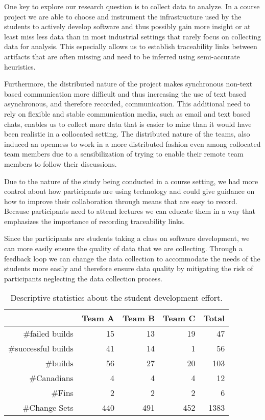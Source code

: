 One key to explore our research question is to collect data to analyze.
In a course project we are able to choose and instrument the infrastructure used by the students to actively develop software and thus possibly gain more insight or at least miss less data than in most industrial settings that rarely focus on collecting data for analysis.
This especially allows us to establish traceability links between artifacts that are often missing and need to be inferred using semi-accurate heuristics.

Furthermore, the distributed nature of the project makes synchronous non-text based communication more difficult and thus increasing the use of text based asynchronous, and therefore recorded, communication.
This additional need to rely on flexible and stable communication media, such as email and text based chats, enables us to collect more data that is easier to mine than it would have been realistic in a collocated setting.
The distributed nature of the teams, also induced an openness to work in a more distributed fashion even among collocated team members due to a sensibilization of trying to enable their remote team members to follow their discussions.

Due to the nature of the study being conducted in a course setting, we had more control about how participants are using technology and could give guidance on how to improve their collaboration through means that are easy to record.
Because participants need to attend lectures we can educate them in a way that emphasizes the importance of recording traceability links.

Since the participants are students taking a class on software development, we can more easily ensure the quality of data that we are collecting.
Through a feedback loop we can change the data collection to accommodate the needs of the students more easily and therefore ensure data quality by mitigating the risk of participants neglecting the data collection process. 

\begin{table}[t]
\centering
\begin{tabular}{rrrrr}
\toprule
& Team A & Team B & Team C & Total\\
\midrule
\#failed builds &15&13&19&47\\
\#successful builds &41&14&1&56\\ 
\#builds & 56 & 27 & 20 & 103 \\
\#Canadians & 4 & 4 & 4 & 12\\
\#Fins & 2 & 2 & 2 & 6\\
\#Change Sets & 440 & 491 &  452& 1383\\
\bottomrule
\end{tabular}
\caption{Descriptive statistics about the student development effort.}
\label{tab:gsd:desc:stats}
\end{table}

